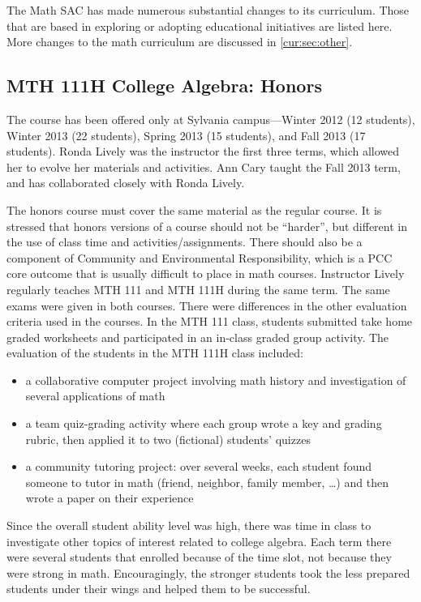 The Math SAC has made numerous substantial changes to its curriculum. Those 
that are based in exploring or adopting educational initiatives are listed here. More 
changes to the math curriculum are discussed in \vref{cur:sec:other}.

\subsection{MTH 111H College Algebra: Honors}\label{cur:sub:111H}

The course has been offered only at Sylvania campus---Winter 2012 (12
students), Winter 2013 (22 students), Spring 2013 (15 students), and Fall 2013
(17 students).  Ronda Lively was the instructor the first three terms, which
allowed her to evolve her materials and activities.  Ann Cary taught the
Fall 2013 term, and has collaborated closely with Ronda Lively. 

The honors course must cover the same material as the regular course. It
is stressed that honors versions of a course should not be ``harder'', but
different in the use of class time and activities/assignments.  There should
also be a component of Community and Environmental Responsibility, which is a
PCC core outcome that is usually difficult to place in math courses.  Instructor
Lively regularly teaches MTH 111 and MTH 111H during the same term.  The same
exams were given in both courses.  There were differences in the other evaluation
criteria used in the courses.  In the MTH 111 class, students submitted take
home graded worksheets and participated in an in-class graded group activity.
The evaluation of the students in the MTH 111H class included:
\begin{itemize}
\item a collaborative computer project involving math history and investigation
  of several applications of math
\item a team quiz-grading activity where each group wrote a key and grading
  rubric, then applied it to two (fictional) students' quizzes
\item a community tutoring project:  over several weeks, each student found someone to
  tutor in math (friend, neighbor, family member, \ldots) and then wrote a paper
  on their experience
\end{itemize}
Since the overall student ability level was high, there was time in class to
investigate other topics of interest related to college algebra.  Each term
there were several students that enrolled because of the time slot,
not because they were strong in math.  Encouragingly, the
stronger students took the less prepared students under their wings and helped
them to be successful.


